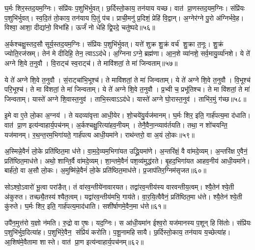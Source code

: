 घ॒र्मः शिर॒स्तद॒यम॒ग्निः। संप्रि॑यः प॒शुभि॑र्भुवत्। छ॒र्दिस्तो॒काय॒ तन॑याय यच्छ। वात॑ प्रा॒णस्तद॒यम॒ग्निः। संप्रि॑यः प॒शुभि॑र्भुवत्। स्व॒दि॒तं तो॒काय॒ तन॑याय पि॒तुं प॑च। प्राची॒मनु॑ प्र॒दिशं॒ प्रेहि॑ वि॒द्वान्। अ॒ग्नेर॑ग्ने पु॒रो अ॑ग्निर्भवे॒ह। विश्वा॒ आशा॒ दीद्या॑नो॒ विभा॑हि। ऊर्जं॑ नो धेहि द्वि॒पदे॒ चतु॑ष्पदे॥५६॥

अ॒र्कश्चक्षु॒स्तद॒सौ सूर्य॒स्तद॒यम॒ग्निः। संप्रि॑यः प॒शुभि॑र्भुवत्। यत्ते॑ शुक्र शु॒क्रं वर्च॑ शु॒क्रा त॒नूः। शु॒क्रं ज्योति॒रज॑स्रम्। तेन॑ मे दीदिहि॒ तेन॒ त्वाऽऽद॑धे। अ॒ग्निनाऽग्ने॒ ब्रह्म॑णा। आ॒न॒शे व्या॑नशे॒ सर्व॒मायु॒र्व्या॑नशे। ये ते॑ अग्ने शि॒वे त॒नुवौ। वि॒राट्च॑ स्व॒राट्च॑। ते मावि॑शतां॒ ते मा॑ जिन्वताम्॥५७॥

ये ते॑ अग्ने शि॒वे त॒नुवौ। सं॒राट्चा॑भि॒भूश्च॑। ते मावि॑शतां॒ ते मा॑ जिन्वताम्। ये ते॑ अग्ने शि॒वे त॒नुवौ। वि॒भूश्च॑ परि॒भूश्च॑। ते मा वि॑शतां॒ ते मा॑ जिन्वताम्। ये ते॑ अग्ने शि॒वे त॒नुवौ। प्र॒भ्वी च॒ प्रभू॑तिश्च। ते मा वि॑शतां॒ ते मा॑ जिन्वताम्। यास्ते॑ अग्ने शि॒वास्त॒नुव॑। ताभि॒स्त्वाऽऽद॑धे। यास्ते॑ अग्ने घो॒रास्त॒नुव॑। ताभि॑र॒मुं ग॑च्छ॥५८॥\anuvakamend[चतु॑ष्पदे जिन्वतां त॒नुव॒स्त्रीणि॑ च]

इ॒मे वा ए॒ते लो॒का अ॒ग्नय॑। ते यदव्या॑वृत्ता आधी॒येर\sn{}। शो॒चये॑यु॒र्यज॑मानम्। घ॒र्मः शिर॒ इति॒ गार्\mbox{}ह॑पत्य॒मा द॑धाति। वात॑ प्रा॒ण इत्य॑न्वाहार्य॒पच॑नम्। अ॒र्कश्चक्षु॒रित्या॑हव॒नीयम्। तेनै॒वैना॒न्व्याव॑र्तयति। तथा॒ न शो॑चयन्ति॒ यज॑मानम्। र॒थ॒न्त॒रम॒भिगा॑यते॒ गार्\mbox{}ह॑पत्य आधी॒यमा॑ने। राथ॑न्तरो॒ वा अ॒यं लो॒कः॥५९॥

अ॒स्मिन्ने॒वैनं॑ लो॒के प्रति॑ष्ठित॒मा ध॑त्ते। वा॒म॒दे॒व्यम॒भिगा॑यत उद्ध्रि॒यमा॑णे। अ॒न्तरि॑क्षं॒ वै वा॑मदे॒व्यम्। अ॒न्तरि॑क्ष ए॒वैनं॒ प्रति॑ष्ठित॒माध॑त्ते। अथो॒ शान्ति॒र्वै वा॑मदे॒व्यम्। शा॒न्तमे॒वैनं॑ पश॒व्य॑मुद्ध॑रते। बृ॒हद॒भिगा॑यत आहव॒नीय॑ आधी॒यमा॑ने। बार्\mbox{}ह॑तो॒ वा अ॒सौ लो॒कः। अ॒मुष्मि॑न्ने॒वैनं॑ लो॒के प्रति॑ष्ठित॒माध॑त्ते। प्र॒जाप॑तिर॒ग्निम॑सृजत॥६०॥

सोऽश्वो॒ऽवारो॑ भू॒त्वा परा॑ङैत्। तं वा॑रव॒न्तीये॑नावारयत। तद्वा॑रव॒न्तीय॑स्य वारवन्तीय॒त्वम्। श्यै॒तेन॑ श्ये॒ती अ॑कुरुत। तच्छ्यै॒तस्य॑ श्यैत॒त्वम्। यद्वा॑रव॒न्तीय॑मभि॒ गाय॑ते। वा॒र॒यि॒त्वैवैनं॒ प्रति॑ष्ठित॒मा ध॑त्ते। श्यै॒तेन॑ श्ये॒ती कु॑रुते। घ॒र्मः शिर॒ इति॒ गार्\mbox{}ह॑पत्य॒माद॑धाति। सशी॑र्\mbox{}षाणमे॒वैन॒मा ध॑त्ते॥६१॥

उपै॑न॒मुत्त॑रो य॒ज्ञो न॑मति। रु॒द्रो वा ए॒षः। यद॒ग्निः। स आ॑धी॒यमा॑न ईश्व॒रो यज॑मानस्य प॒शून् हिसि॑तोः। संप्रि॑यः प॒शुभि॑र्भुव॒दित्या॑ह। प॒शुभि॑रे॒वैन॒ संप्रि॑यं करोति। प॒शू॒नामहिसायै। छ॒र्दिस्तो॒काय॒ तन॑याय य॒च्छेत्या॑ह। आ॒शिष॑मे॒वैतामा शास्ते। वात॑ प्रा॒ण इत्य॑न्वाहार्य॒पच॑नम्॥६२॥

